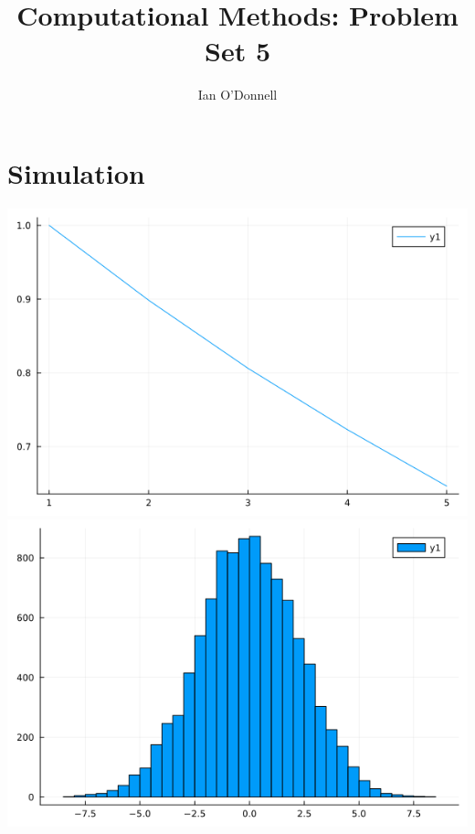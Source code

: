 \documentclass{article}
\title{Computational Methods: Problem Set 5}
\author{Ian O'Donnell}
\date{\vspace{-5ex}}
\begin{document}
\maketitle

\section*{Simulation}
\begin{center}
    \includegraphics[scale = 0.6]{p1.png} \\
    \includegraphics[scale = 0.6]{p6.png}
\end{center}
    
\end{document}
